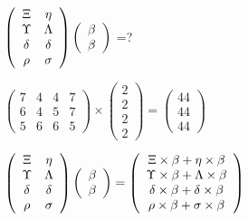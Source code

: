 \documentclass[12pt]{article}
\begin{document}
 
$  %
 \left( \begin{array}
 {
 c
 c
 }
                    \Xi & 
 \eta \\ 
 \Upsilon & 
 \Lambda \\ 
 \delta & 
 \delta \\ 
 \rho & 
 \sigma
 \end{array} \right)
 \left( \begin{array}
 {
 c
 }
 \beta \\ 
 \beta
 \end{array} \right)
$ =?
 
 
 
\noindent{}
 
 

 
$\left( \begin{array}{ccccccccccccccc}
           7 & 
           4 & 
           4 & 
           7 \\ 
           6 & 
           4 & 
           5 & 
           7 \\ 
           5 & 
           6 & 
           6 & 
           5
\end{array}\right) \times
\left( \begin{array}{c}
           2 \\ 
           2 \\ 
           2 \\ 
           2
\end{array}\right)  =
\left( \begin{array}{c}
          44 \\ 
          44 \\ 
          44
\end{array}\right)  $
 
$  %
 \left( \begin{array}
 {
 c
 c
 }
                    \Xi & 
 \eta \\ 
 \Upsilon & 
 \Lambda \\ 
 \delta & 
 \delta \\ 
 \rho & 
 \sigma
 \end{array} \right)
 \left( \begin{array}
 {
 c
 }
 \beta \\ 
 \beta
 \end{array} \right)
=
  \left( \begin{array}
 {
 c
 }
                    \Xi \times  \beta   +  \eta \times  \beta \\ 
 \Upsilon \times  \beta   +  \Lambda \times  \beta \\ 
 \delta \times  \beta   +  \delta \times  \beta \\ 
 \rho \times  \beta   +  \sigma \times  \beta
 \end{array} \right)
$
 
\end{document}
